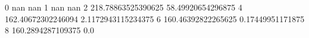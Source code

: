 0 nan nan
1 nan nan
2 218.78863525390625 58.49920654296875
4 162.40672302246094 2.1172943115234375
6 160.46392822265625 0.17449951171875
8 160.2894287109375 0.0
